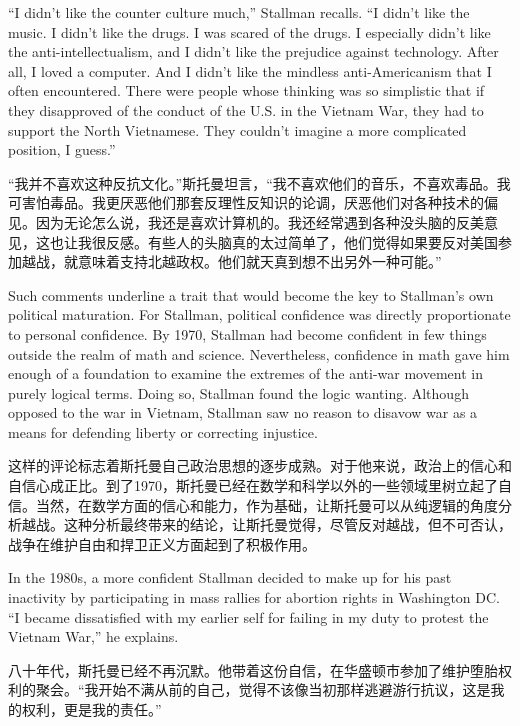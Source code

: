 \ifdefined\eng
``I didn't like the counter culture much,'' Stallman recalls. ``I didn't like the music. I didn't like the drugs. I was scared of the drugs. I especially didn't like the anti-intellectualism, and I didn't like the prejudice against technology. After all, I loved a computer. And I didn't like the mindless anti-Americanism that I often encountered. There were people whose thinking was so simplistic that if they disapproved of the conduct of the U.S. in the Vietnam War, they had to support the North Vietnamese. They couldn't imagine a more complicated position, I guess.''
\fi

\ifdefined\chs
``我并不喜欢这种反抗文化。''斯托曼坦言，``我不喜欢他们的音乐，不喜欢毒品。我可害怕毒品。我更厌恶他们那套反理性反知识的论调，厌恶他们对各种技术的偏见。因为无论怎么说，我还是喜欢计算机的。我还经常遇到各种没头脑的反美意见，这也让我很反感。有些人的头脑真的太过简单了，他们觉得如果要反对美国参加越战，就意味着支持北越政权。他们就天真到想不出另外一种可能。''
\fi

\ifdefined\eng
Such comments underline a trait that would become the key to Stallman's own political maturation. For Stallman, political confidence was directly proportionate to personal confidence. By 1970, Stallman had become confident in few things outside the realm of math and science. Nevertheless, confidence in math gave him enough of a foundation to examine the extremes of the anti-war movement in purely logical terms.  Doing so, Stallman found the logic wanting. Although opposed to the war in Vietnam, Stallman saw no reason to disavow war as a means for defending liberty or correcting injustice.
\fi

\ifdefined\chs
这样的评论标志着斯托曼自己政治思想的逐步成熟。对于他来说，政治上的信心和自信心成正比。到了1970，斯托曼已经在数学和科学以外的一些领域里树立起了自信。当然，在数学方面的信心和能力，作为基础，让斯托曼可以从纯逻辑的角度分析越战。这种分析最终带来的结论，让斯托曼觉得，尽管反对越战，但不可否认，战争在维护自由和捍卫正义方面起到了积极作用。
\fi

\ifdefined\eng
In the 1980s, a more confident Stallman decided to make up for his past inactivity by participating in mass rallies for abortion rights in Washington DC.  ``I became dissatisfied with my earlier self for failing in my duty to protest the Vietnam War,'' he explains.
\fi

\ifdefined\chs
八十年代，斯托曼已经不再沉默。他带着这份自信，在华盛顿市参加了维护堕胎权利的聚会。``我开始不满从前的自己，觉得不该像当初那样逃避游行抗议，这是我的权利，更是我的责任。''
\fi

